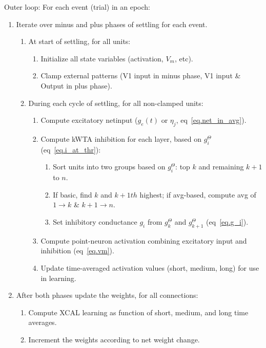 Outer loop: For each event (trial) in an epoch:
\begin{enumerate}
\item Iterate over minus and plus phases of settling for each event.
 \begin{enumerate}
 \item At start of settling, for all units:
  \begin{enumerate}
  \item Initialize all state variables (activation, $V_m$, etc).
  \item Clamp external patterns (V1 input in minus phase, V1 input \& Output in plus phase).
  \end{enumerate}
 \item During each cycle of settling, for all non-clamped units:
  \begin{enumerate}
  \item Compute excitatory netinput ($g_e(t)$ or $\eta_j$,
   eq~\ref{eq.net_in_avg}).
  \item Compute kWTA inhibition for each layer, based on $g_i^{\Theta}$
   (eq~\ref{eq.i_at_thr}):
   \begin{enumerate}
   \item Sort units into two groups based on $g_i^{\Theta}$: top $k$ and remaining $k+1$ to $n$.
   \item If basic, find $k$ and $k+1th$ highest; if avg-based, compute avg of $1\rightarrow k$ \& $k+1 \rightarrow n$.
   \item Set inhibitory conductance $g_i$ from $g^{\Theta}_k$ and $g^{\Theta}_{k+1}$ (eq~\ref{eq.g_i}).
   \end{enumerate}
  \item Compute point-neuron activation combining excitatory input and inhibition (eq~\ref{eq.vm}).
  \item Update time-averaged activation values (short, medium, long) for use in learning.
  \end{enumerate}
 \end{enumerate}
 \item After both phases update the weights, for all connections:
 \begin{enumerate}
 \item Compute XCAL learning as function of short, medium, and long time averages.
 \item Increment the weights according to net weight change.
 \end{enumerate}
\end{enumerate}


